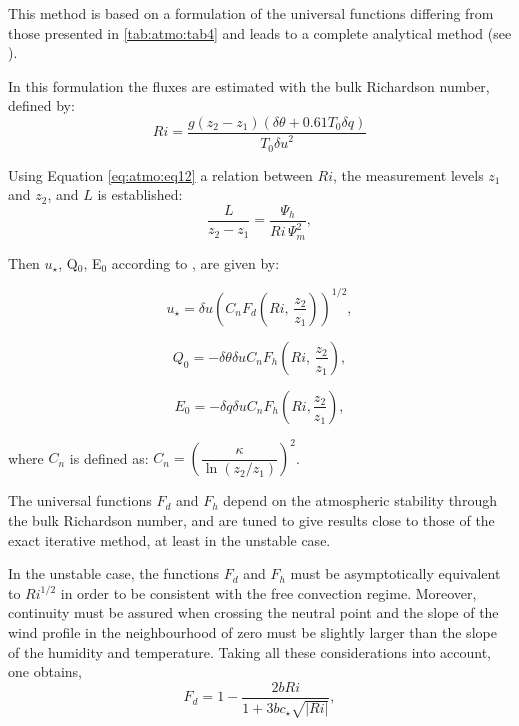 This method is based on a formulation of the universal functions differing
from those presented in \tablename{} \ref{tab:atmo:tab4} and leads to a complete analytical method
(see \cite{Louis:1982}).

In this formulation the fluxes are estimated with the bulk Richardson
number, defined by:
\begin{equation}
\label{eq13}
Ri=\frac{g(z_{2} -z_{1})
({\delta \theta }
+0.61T_{0} \delta q)}
{T_{0} {\delta u}^{2}}
\end{equation}

Using Equation \eqref{eq:atmo:eq12} a relation between $Ri$, the measurement levels $z_{1}$ and
$z_{2}$, and $L$ is established:
\begin{equation}
\label{eq14}
\frac{L}{z_{2} -z_{1}
}=\frac{\Psi_{h} }{Ri\,\Psi_{m}^{2}},
\end{equation}

Then $u_{\star} $, Q$_{0}$, E$_{0}$ according to \cite{Louis:1982}, are
given by:

\begin{equation}
\label{eq15}
u_{\star} =\delta u \left( C_{n} F_{d} \left(Ri, \, \frac{z_{2}}{z_{1}} \right) \right)^{1/2},
\end{equation}

\begin{equation}
\label{eq16}
Q_{0} =-\delta \theta \delta u C_{n} F_{h} \left( Ri,\,\frac{z_{2} }{z_{1} }\right),
\end{equation}

\begin{equation}
\label{eq17}
E_{0} =-\delta q \delta u C_{n} F_{h} \left( Ri, \frac {z_{2}}{z_{1}} \right),
\end{equation}

where $C_{n} $ is defined as: $C_{n} =\left(
{\dfrac{\kappa}{\ln(z_{2} /z_{1} )}}
\right)^{2}$.

The universal functions $F_{d}$ and $F_{h}$ depend on the atmospheric
stability through the bulk Richardson number, and are tuned to give results
close to those of the exact iterative method, at least in the unstable case.

In the unstable case, the functions $F_{d}$ and $F_{h}$ must be
asymptotically equivalent to $Ri^{1/2}$ in order to be consistent with the
free convection regime. Moreover, continuity must be assured when crossing
the neutral point and the slope of the wind profile in the neighbourhood of
zero must be slightly larger than the slope of the humidity and temperature.
Taking all these considerations into account, one obtains,
\begin{equation}
\label{eq18}
F_{d} =1-\frac{2bRi
}{1+3b c_{\star} \sqrt {\left| {Ri} \right|} },
\end{equation}

